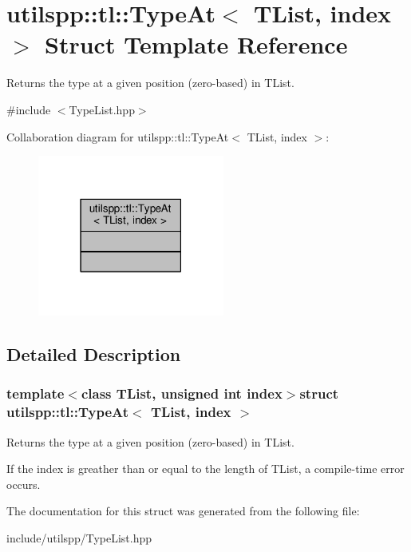 \hypertarget{structutilspp_1_1tl_1_1TypeAt}{\section{utilspp\-:\-:tl\-:\-:Type\-At$<$ T\-List, index $>$ Struct Template Reference}
\label{structutilspp_1_1tl_1_1TypeAt}
}


Returns the type at a given position (zero-\/based) in T\-List.  




{\ttfamily \#include $<$Type\-List.\-hpp$>$}



Collaboration diagram for utilspp\-:\-:tl\-:\-:Type\-At$<$ T\-List, index $>$\-:
\nopagebreak
\begin{figure}[H]
\begin{center}
\leavevmode
\includegraphics[width=174pt]{structutilspp_1_1tl_1_1TypeAt__coll__graph}
\end{center}
\end{figure}


\subsection{Detailed Description}
\subsubsection*{template$<$class T\-List, unsigned int index$>$struct utilspp\-::tl\-::\-Type\-At$<$ T\-List, index $>$}

Returns the type at a given position (zero-\/based) in T\-List. 

If the index is greather than or equal to the length of T\-List, a compile-\/time error occurs. 

The documentation for this struct was generated from the following file\-:\begin{DoxyCompactItemize}
\item 
include/utilspp/Type\-List.\-hpp\end{DoxyCompactItemize}
